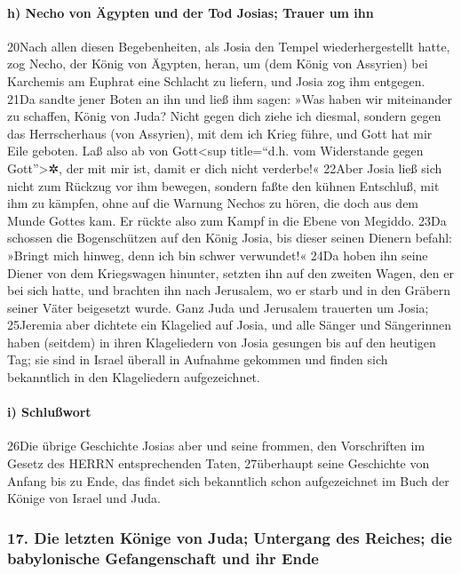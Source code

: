 \hypertarget{h-necho-von-uxe4gypten-und-der-tod-josias-trauer-um-ihn}{%
\paragraph{h) Necho von Ägypten und der Tod Josias; Trauer um
ihn}\label{h-necho-von-uxe4gypten-und-der-tod-josias-trauer-um-ihn}}

20Nach allen diesen Begebenheiten, als Josia den Tempel
wiederhergestellt hatte, zog Necho, der König von Ägypten, heran, um
(dem König von Assyrien) bei Karchemis am Euphrat eine Schlacht zu
liefern, und Josia zog ihm entgegen. 21Da sandte jener Boten an ihn und
ließ ihm sagen: »Was haben wir miteinander zu schaffen, König von Juda?
Nicht gegen dich ziehe ich diesmal, sondern gegen das Herrscherhaus (von
Assyrien), mit dem ich Krieg führe, und Gott hat mir Eile geboten. Laß
also ab von Gott\textless sup title=``d.h. vom Widerstande gegen
Gott''\textgreater✲, der mit mir ist, damit er dich nicht verderbe!«
22Aber Josia ließ sich nicht zum Rückzug vor ihm bewegen, sondern faßte
den kühnen Entschluß, mit ihm zu kämpfen, ohne auf die Warnung Nechos zu
hören, die doch aus dem Munde Gottes kam. Er rückte also zum Kampf in
die Ebene von Megiddo. 23Da schossen die Bogenschützen auf den König
Josia, bis dieser seinen Dienern befahl: »Bringt mich hinweg, denn ich
bin schwer verwundet!« 24Da hoben ihn seine Diener von dem Kriegswagen
hinunter, setzten ihn auf den zweiten Wagen, den er bei sich hatte, und
brachten ihn nach Jerusalem, wo er starb und in den Gräbern seiner Väter
beigesetzt wurde. Ganz Juda und Jerusalem trauerten um Josia; 25Jeremia
aber dichtete ein Klagelied auf Josia, und alle Sänger und Sängerinnen
haben (seitdem) in ihren Klageliedern von Josia gesungen bis auf den
heutigen Tag; sie sind in Israel überall in Aufnahme gekommen und finden
sich bekanntlich in den Klageliedern aufgezeichnet.

\hypertarget{i-schluuxdfwort}{%
\paragraph{i) Schlußwort}\label{i-schluuxdfwort}}

26Die übrige Geschichte Josias aber und seine frommen, den Vorschriften
im Gesetz des HERRN entsprechenden Taten, 27überhaupt seine Geschichte
von Anfang bis zu Ende, das findet sich bekanntlich schon aufgezeichnet
im Buch der Könige von Israel und Juda.

\hypertarget{die-letzten-kuxf6nige-von-juda-untergang-des-reiches-die-babylonische-gefangenschaft-und-ihr-ende}{%
\subsubsection{17. Die letzten Könige von Juda; Untergang des Reiches;
die babylonische Gefangenschaft und ihr
Ende}\label{die-letzten-kuxf6nige-von-juda-untergang-des-reiches-die-babylonische-gefangenschaft-und-ihr-ende}}

